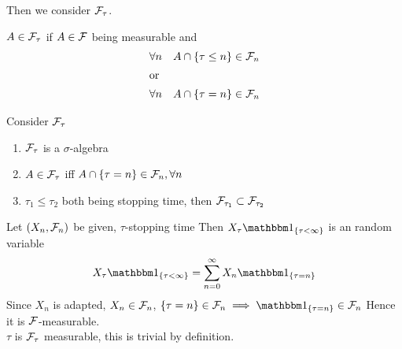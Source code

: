 Then we consider $\mathcal{F}_\tau$.
\begin{dfn}
$A\in \mathcal{F}_\tau$ if $A\in \mathcal{F}$ being measurable and 
\begin{align*}
    \forall n\quad A\cap \{\tau \leq n\} \in \mathcal{F}_n \\
    \intertext{or}
    \forall n \quad A\cap \{\tau = n\} \in \mathcal{F}_n
\end{align*}
\end{dfn}
\begin{thm}
Consider $\mathcal{F}_\tau$
\begin{enumerate}
    \item $\mathcal{F}_\tau$ is a $\sigma$-algebra
    \item $A\in \mathcal{F}_\tau$ iff $A\cap \{\tau = n\}\in \mathcal{F}_n, \forall n$
    \item $\tau_1 \leq \tau_2$ both being stopping time, then $\mathcal{F}_{\tau_1}\subset \mathcal{F}_{\tau_2}$
\end{enumerate}
\end{thm}
\pf

\vfill
Let $(X_n, \mathcal{F}_n)$ be given, $\tau$-stopping time Then $X_\tau\I_{\{\tau < \infty\}}$ is an random variable \\
\pf 
\begin{equation*}
    X_\tau\I_{\{\tau < \infty\}} = \bigs{n=0}^\infty X_n \I_{\{\tau =n\}}
\end{equation*}Since $X_n$ is adapted, $X_n\in \mathcal{F}_n$, $\{\tau = n\} \in \F_n \implies \I_{\{\tau =n\}} \in \F_n$ Hence it is $\mathcal{F}$-measurable. \\
$\tau$ is $\mathcal{F}_\tau$ measurable, this is trivial by definition.

\newpage 
